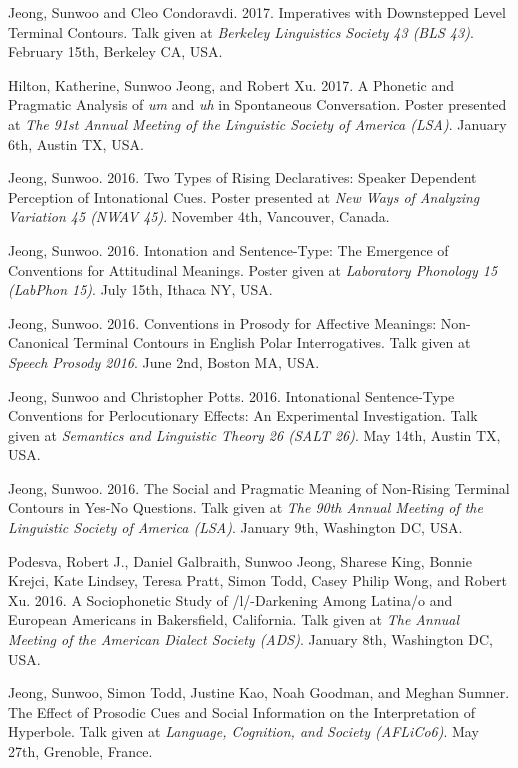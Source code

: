 \documentclass[letterpaper]{article}
\renewenvironment{itemize}{
  \begin{list}{}{
    \setlength{\leftmargin}{1.5em}
  }
}{
  \end{list}
}
\begin{document}
\begin{itemize}
\item Jeong, Sunwoo and Cleo Condoravdi. 2017. Imperatives with Downstepped Level Terminal Contours. Talk given at {\it Berkeley Linguistics Society 43 (BLS 43)}. February 15th, Berkeley CA, USA.

\item Hilton, Katherine, Sunwoo Jeong, and Robert Xu. 2017. A Phonetic and Pragmatic Analysis of {\it um} and {\it uh} in Spontaneous Conversation. Poster presented at {\it The 91st Annual Meeting of the Linguistic Society of America (LSA)}. January 6th, Austin TX, USA.

\item Jeong, Sunwoo. 2016. Two Types of Rising Declaratives: Speaker Dependent Perception of Intonational Cues. Poster presented at {\it New Ways of Analyzing Variation 45 (NWAV 45)}. November 4th, Vancouver, Canada.

\item Jeong, Sunwoo. 2016. Intonation and Sentence-Type: The Emergence of Conventions for Attitudinal Meanings. Poster given at {\it Laboratory Phonology 15 (LabPhon 15)}. July 15th, Ithaca NY, USA.

\item Jeong, Sunwoo. 2016. Conventions in Prosody for Affective Meanings: Non-Canonical Terminal Contours in English Polar Interrogatives. Talk given at {\it Speech Prosody 2016}. June 2nd, Boston MA, USA.

\item Jeong, Sunwoo and Christopher Potts. 2016. Intonational Sentence-Type Conventions for Perlocutionary Effects: An Experimental Investigation. Talk given at {\it Semantics and Linguistic Theory 26 (SALT 26)}. May 14th, Austin TX, USA.

\item Jeong, Sunwoo. 2016. The Social and Pragmatic Meaning of Non-Rising Terminal Contours in Yes-No Questions. Talk given at {\it The 90th Annual Meeting of the Linguistic Society of America (LSA)}. January 9th, Washington DC, USA.

\item Podesva, Robert J., Daniel Galbraith, Sunwoo Jeong, Sharese King, Bonnie Krejci, Kate Lindsey, Teresa Pratt, Simon Todd, Casey Philip Wong, and Robert Xu. 2016. A Sociophonetic Study of /l/-Darkening Among Latina/o and European Americans in Bakersfield, California. Talk given at {\it The Annual Meeting of the American Dialect Society (ADS)}. January 8th, Washington DC, USA.

\item Jeong, Sunwoo, Simon Todd, Justine Kao, Noah Goodman, and Meghan Sumner. The Effect of Prosodic Cues and Social Information on the Interpretation of Hyperbole. Talk given at {\it Language, Cognition, and Society (AFLiCo6)}. May 27th, Grenoble, France.


\end{itemize}
\end{document}
